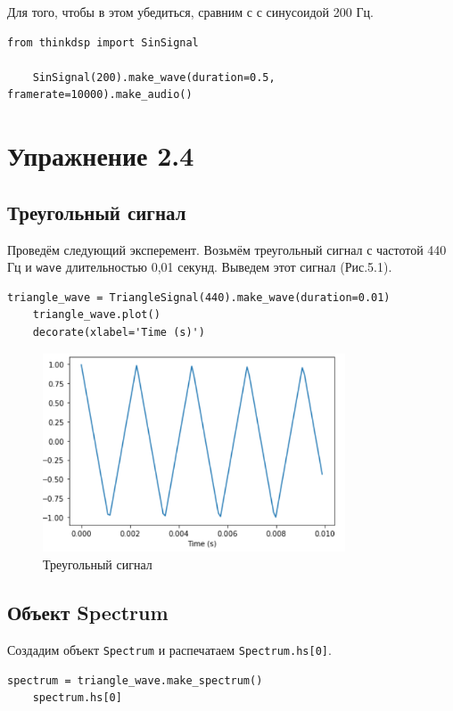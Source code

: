 \documentclass[a4paper,12pt]{report}
\begin{document}
    Для того, чтобы в этом убедиться, сравним с с синусоидой 200 Гц.
\begin{lstlisting}[caption=Создание синусоиды 200 Гц]
    from thinkdsp import SinSignal

    SinSignal(200).make_wave(duration=0.5, framerate=10000).make_audio()
\end{lstlisting} 

\chapter{Упражнение 2.4}  
\section{Треугольный сигнал}
    Проведём следующий эксперемент. Возьмём треугольный сигнал с частотой 440 Гц и \texttt{wave} длительностью 0,01 секунд. Выведем этот сигнал (Рис.5.1).
\begin{lstlisting}[caption=Создание треугольного сигнала 440 Гц]
    triangle_wave = TriangleSignal(440).make_wave(duration=0.01)
    triangle_wave.plot()
    decorate(xlabel='Time (s)')
\end{lstlisting}

\begin{figure}[H]
        \centering
        \includegraphics[width=0.8\textwidth]{fig5-1.PNG}
        \caption{Треугольный сигнал}
        \label{fig:fig5-1}
\end{figure}

\section{Объект Spectrum}  
    Создадим объект \texttt{Spectrum} и распечатаем \texttt{Spectrum.hs[0]}.
\begin{lstlisting}[caption=Вывод нулевой компоненты]
    spectrum = triangle_wave.make_spectrum()
    spectrum.hs[0]
\end{lstlisting}   
    
\end{document}
